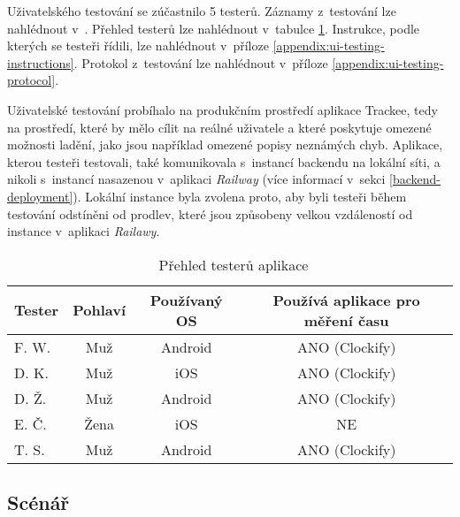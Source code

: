 Uživatelského testování se zúčastnilo 5 testerů. Záznamy z~testování lze nahlédnout v~\cite{ui-testing-playlist}. Přehled testerů lze nahlédnout v~tabulce \ref{table:testers}. Instrukce, podle kterých se testeři řídili, lze nahlédnout v~příloze \ref{appendix:ui-testing-instructions}. Protokol z~testování lze nahlédnout v~příloze \ref{appendix:ui-testing-protocol}.

Uživatelské testování probíhalo na produkčním prostředí aplikace Trackee, tedy na prostředí, které by mělo cílit na reálné uživatele a které poskytuje omezené možnosti ladění, jako jsou například omezené popisy neznámých chyb. Aplikace, kterou testeři testovali, také komunikovala s~instancí backendu na lokální síti, a nikoli s~instancí nasazenou v~aplikaci \emph{Railway} (více informací v~sekci \ref{backend-deployment}). Lokální instance byla zvolena proto, aby byli testeři během testování odstíněni od prodlev, které jsou způsobeny velkou vzdáleností od instance v~aplikaci \emph{Railawy}.

\begin{table}\centering
\begin{tabular}{l|c|c|c}
	Tester		& Pohlaví	& Používaný OS	& Používá aplikace pro měření času	\tabularnewline \hline 
 	F. W.		& Muž		& Android       & ANO (Clockify)	                \tabularnewline \hline
	D. K.		& Muž		& iOS	        & ANO (Clockify)                	\tabularnewline \hline
	D. Ž.		& Muž		& Android       & ANO (Clockify)               		\tabularnewline \hline
	E. Č.		& Žena		& iOS	        & NE 	                	        \tabularnewline \hline
	T. S.		& Muž		& Android       & ANO (Clockify)	                \tabularnewline \hline
\end{tabular}
\vspace{0.5cm}
\caption[Přehled testerů aplikace]{~Přehled testerů aplikace}\label{table:testers}
\end{table} 

\subsection{Scénář}

